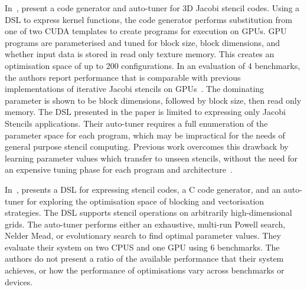 In~\cite{Zhang2013a}, \citeauthor{Zhang2013a} present a code generator and auto-tuner for 3D Jacobi stencil codes. Using a DSL to express kernel functions, the code generator performs substitution from one of two CUDA templates to create programs for execution on GPUs. GPU programs are parameterised and tuned for block size, block dimensions, and whether input data is stored in read only texture memory. This creates an optimisation space of up to 200 configurations. In an evaluation of 4 benchmarks, the authors report performance that is comparable with previous implementations of iterative Jacobi stencils on GPUs~\cite{Holewinski2012, Phillips2010}. The dominating parameter is shown to be block dimensions, followed by block size, then read only memory. The DSL presented in the paper is limited to expressing only Jacobi Stencils applications. Their auto-tuner requires a full enumeration of the parameter space for each program, which may be impractical for the needs of general purpose stencil computing. Previous work overcomes this drawback by learning parameter values which transfer to unseen stencils, without the need for an expensive tuning phase for each program and architecture~\cite{Cummins2015}.

In~\cite{Christen2011}, \citeauthor{Christen2011} presents a DSL for expressing stencil codes, a C code generator, and an auto-tuner for exploring the optimisation space of blocking and vectorisation strategies. The DSL supports stencil operations on arbitrarily high-dimensional grids. The auto-tuner performs either an exhaustive, multi-run Powell search, Nelder Mead, or evolutionary search to find optimal parameter values. They evaluate their system on two CPUS and one GPU using 6 benchmarks. The authors do not present a ratio of the available performance that their system achieves, or how the performance of optimisations vary across benchmarks or devices.


